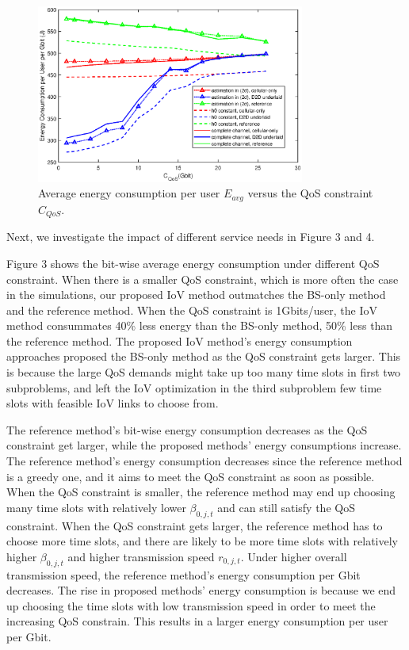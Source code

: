 \documentclass{ieeeaccess}
\begin{document}
\begin{figure} [htb]
\includegraphics*[width=8.8cm]{Cqos.eps}
\caption{Average energy consumption per user $E_{avg}$ versus the QoS constraint ${C_{QoS}}$.}\label{fig:3}
\end{figure}



Next, we investigate the impact of different service needs in Figure 3 and 4. 

Figure 3 shows the bit-wise average energy consumption under different QoS constraint.
When there is a smaller QoS constraint, which is more often the case in the simulations, our proposed IoV method outmatches the BS-only method and the reference method. When the QoS constraint is 1Gbits/user, the IoV method consummates 40\% less energy than the BS-only method, 50\% less than the reference method. The proposed IoV method's energy consumption approaches proposed the BS-only method as the QoS constraint gets larger. This is because the large QoS demands might take up too many time slots in first two subproblems, and left the IoV optimization in the third subproblem few time slots with feasible IoV links to choose from.

The reference method's bit-wise energy consumption decreases as the QoS constraint get larger, while the proposed methods' energy consumptions increase. The reference method's energy consumption decreases since the reference method is a greedy one, and it aims to meet the QoS constraint as soon as possible. When the QoS constraint is smaller, the reference method may end up choosing many time slots with relatively lower ${\beta _{0,j,t}}$ and can still satisfy the QoS constraint. When the QoS constraint gets larger, the reference method has to choose more time slots, and there are likely to be more time slots with relatively higher ${\beta _{0,j,t}}$ and higher transmission speed ${r_{0,j,t}}$. Under higher overall transmission speed, the reference method's energy consumption per Gbit decreases. The rise in proposed methods' energy consumption is because we end up choosing the time slots with low transmission speed in order to meet the increasing QoS constrain. This results in a larger energy consumption per user per Gbit. 
\end{document}
